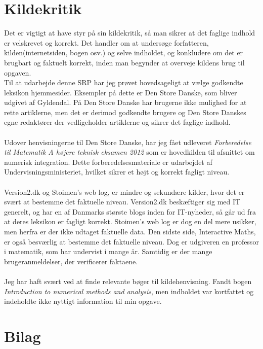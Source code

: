 \documentclass[12pt]{article}
\numberwithin{equation}{section}
\begin{document}
\section{Kildekritik}
Det er vigtigt at have styr på sin kildekritik, så man sikrer at det faglige indhold er velskrevet og korrekt. Det handler om at undersøge forfatteren, kilden(internetsiden, bogen osv.) og selve indholdet, og konkludere om det er brugbart og faktuelt korrekt, inden man begynder at overveje kildens brug til opgaven.
\\
Til at udarbejde denne SRP har jeg prøvet hovedsageligt at vælge godkendte leksikon hjemmesider. Eksempler på dette er Den Store Danske, som bliver udgivet af Gyldendal. På Den Store Danske har brugerne ikke mulighed for at rette artiklerne, men det er derimod godkendte brugere og Den Store Danskes egne redaktører der vedligeholder artiklerne og sikrer det faglige indhold.
\\\\
Udover henvisningerne til Den Store Danske, har jeg fået udleveret \emph{Forberedelse til Matematik A højere teknisk eksamen 2012} som er hovedkilden til afsnittet om numerisk integration. Dette forberedelsesmateriale er udarbejdet af Undervisningsministeriet, hvilket sikrer et højt og korrekt fagligt niveau.
\\\\
Version2.dk og Stoimen's web log, er mindre og sekundære kilder, hvor det er svært at bestemme det faktuelle niveau. Version2.dk beskæftiger sig med IT generelt, og har en af Danmarks største blogs inden for IT-nyheder, så går ud fra at deres leksikon er fagligt korrekt. Stoimen's web log er dog en del mere usikker, men herfra er der ikke udtaget faktuelle data. Den sidste side, Interactive Maths, er også besværlig at bestemme det faktuelle niveau. Dog er udgiveren en professor i matematik, som har undervist i mange år. Samtidig er der mange brugeranmeldelser, der verificerer faktaene. 
\\\\
Jeg har haft svært ved at finde relevante bøger til kildehenvisning. Fandt bogen \emph{Introduction to numerical methods and analysis}, men indholdet var kortfattet og indeholdte ikke nyttigt information til min opgave.
\section{Bilag}
\end{document}
